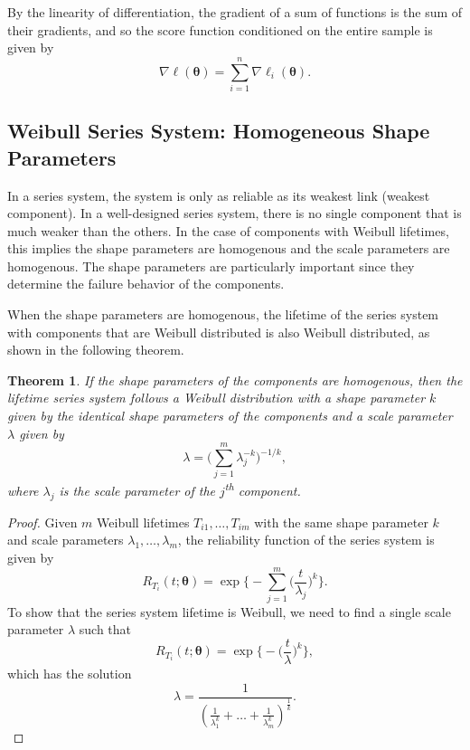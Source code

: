 \documentclass[
]{article}
\theoremstyle{definition}
\theoremstyle{plain}
\newtheorem{theorem}{Theorem}[section]
\theoremstyle{definition}
\theoremstyle{definition}
\theoremstyle{definition}
\theoremstyle{definition}
\theoremstyle{remark}
\begin{document}
By the linearity of differentiation, the gradient of a sum of functions is
the sum of their gradients, and so the score function conditioned on the entire
sample is given by
\begin{equation}
\label{eq:weibull-series-score}
\nabla \ell(\boldsymbol{\theta}) = \sum_{i=1}^n \nabla \ell_i(\boldsymbol{\theta}).
\end{equation}

\hypertarget{reduced-weibull}{%
\subsection{Weibull Series System: Homogeneous Shape Parameters}\label{reduced-weibull}}

In a series system, the system is only as reliable as its weakest link
(weakest component). In a well-designed series system, there is no single
component that is much weaker than the others. In the case of components with
Weibull lifetimes, this implies the shape parameters are homogenous and the
scale parameters are homogenous. The shape parameters are particularly important
since they determine the failure behavior of the components.

When the shape parameters are homogenous, the lifetime of the series system with
components that are Weibull distributed is also Weibull distributed, as shown in
the following theorem.

\begin{theorem}
\protect\hypertarget{thm:weibull-series-system}{}\label{thm:weibull-series-system}If the shape parameters of the components are homogenous, then the lifetime
series system follows a Weibull distribution with a shape parameter \(k\) given by
the identical shape parameters of the components and a scale parameter \(\lambda\)
given by
\begin{equation}
\label{eq:sys-weibull-scale}
\lambda = \biggl(\sum_{j=1}^{m} \lambda_j^{-k}\biggr)^{-1/k},
\end{equation}
where \(\lambda_j\) is the scale parameter of the \(j\)\textsuperscript{th} component.
\end{theorem}

\begin{proof}
Given \(m\) Weibull lifetimes \(T_{i 1}, \ldots, T_{i m}\) with the same shape
parameter \(k\) and scale parameters \(\lambda_1, \ldots, \lambda_m\), the
reliability function of the series system is given by
\[
R_{T_i}(t;\boldsymbol{\theta}) =
    \exp\biggl\{-\sum_{j=1}^{m}\biggl(\frac{t}{\lambda_j}\biggr)^{k}\biggr\}.
\]
To show that the series system lifetime is Weibull, we need to find a single
scale parameter \(\lambda\) such that
\[
R_{T_i}(t;\boldsymbol{\theta}) = \exp\biggl\{-\biggl(\frac{t}{\lambda}\biggr)^{k}\biggr\},
\]
which has the solution
\[
\lambda = \frac{1}{\left(\frac{1}{\lambda_1^k} + \ldots +
    \frac{1}{\lambda_m^k}\right)^{\frac{1}{k}}}.
\]
\end{proof}
\end{document}
